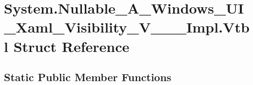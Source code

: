 \hypertarget{struct_system_1_1_nullable___a___windows___u_i___xaml___visibility___v_______impl_1_1_vtbl}{}\section{System.\+Nullable\+\_\+\+A\+\_\+\+Windows\+\_\+\+U\+I\+\_\+\+Xaml\+\_\+\+Visibility\+\_\+\+V\+\_\+\+\_\+\+\_\+\+Impl.\+Vtbl Struct Reference}
\label{struct_system_1_1_nullable___a___windows___u_i___xaml___visibility___v_______impl_1_1_vtbl}
\subsection*{Static Public Member Functions}
